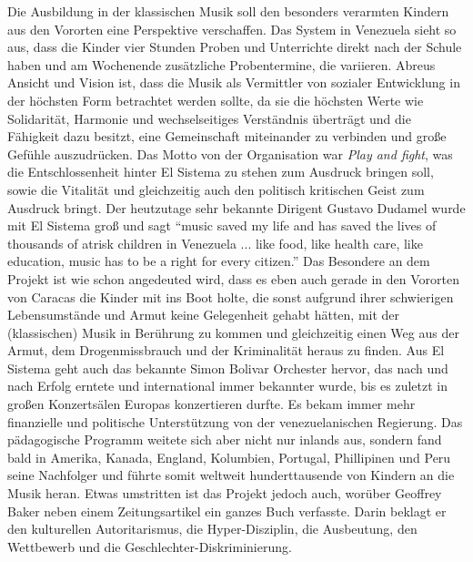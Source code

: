 Die Ausbildung in der klassischen Musik soll den besonders verarmten Kindern aus
den Vororten eine Perspektive verschaffen. Das System in Venezuela sieht so aus,
dass die Kinder vier Stunden Proben und Unterrichte direkt nach der Schule haben
und am Wochenende zusätzliche Probentermine, die variieren. Abreus Ansicht und
Vision ist, dass die Musik als Vermittler von sozialer Entwicklung in der
höchsten Form betrachtet werden sollte, da sie die höchsten Werte wie
Solidarität, Harmonie und wechselseitiges Verständnis überträgt und die
Fähigkeit dazu besitzt, eine Gemeinschaft miteinander zu verbinden und große
Gefühle auszudrücken. Das Motto von der Organisation war \emph{Play and fight},
was die Entschlossenheit hinter El Sistema zu stehen zum Ausdruck bringen
soll, sowie die Vitalität und gleichzeitig auch den politisch kritischen Geist
zum Ausdruck bringt. Der heutzutage sehr bekannte Dirigent Gustavo Dudamel wurde
mit El Sistema groß und sagt \enquote{music saved my life and has saved the lives of
thousands of atrisk children in Venezuela ... like food, like health care, like
education, music has to be a right for every
citizen.}%
Das Besondere an dem Projekt ist wie schon angedeuted wird, dass es eben auch
gerade in den Vororten von Caracas die Kinder mit ins Boot holte, die sonst
aufgrund ihrer schwierigen Lebensumstände und Armut keine Gelegenheit gehabt
hätten, mit der (klassischen) Musik in Berührung zu kommen und gleichzeitig
einen Weg aus der Armut, dem Drogenmissbrauch und der Kriminalität heraus zu
finden. Aus El Sistema geht auch das bekannte Simon Bolivar Orchester hervor,
das nach und nach Erfolg erntete und international immer bekannter wurde, bis es
zuletzt in großen Konzertsälen Europas konzertieren durfte. Es bekam immer
mehr finanzielle und politische Unterstützung von der venezuelanischen Regierung. Das
pädagogische Programm weitete sich aber nicht nur inlands aus, sondern fand bald
in Amerika, Kanada, England, Kolumbien, Portugal, Phillipinen und Peru seine
Nachfolger und führte somit weltweit hunderttausende von Kindern an die Musik
heran. Etwas umstritten ist das Projekt jedoch auch, worüber Geoffrey Baker
neben einem Zeitungsartikel ein ganzes Buch verfasste. Darin beklagt er den
kulturellen Autoritarismus, die Hyper-Disziplin, die Ausbeutung, den Wettbewerb
und die Geschlechter-Diskriminierung. 

